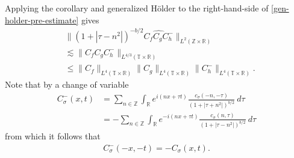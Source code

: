 \documentclass[handout]{beamer}
\numberwithin{equation}{section}
\newcommand{\rr}{\mathbb{R}}
\newcommand{\zz}{\mathbb{Z}}
\newcommand{\ci}{\mathbb{T}}
\newcommand{\wh}{\widehat}
\begin{document}
\begin{frame}

Applying the corollary and generalized H\"{o}lder to the 
right-hand-side of \eqref{gen-holder-pre-estimate} gives
%
%
\begin{equation}
	\label{gen-holder-piece-1}
	\begin{split}
		& \|\left( 1 + | \tau - n^{2 } | \right)^{-b/2} \wh{C_f C_{ 
		g } C^-_{h}}\|_{L^2(\zz \times \rr)}
		\\
		& \lesssim  \|C_f C_{g} C^-_{h} \|_{L^{4/3}(\ci \times \rr)}
		\\
		& \le \|C_f \|_{L^4(\ci \times \rr)} \|C_{g}\|_{L^4(\ci \times \rr)} 
		\|C^-_{h}\|_{L^4(\ci \times \rr)}.
	\end{split}
\end{equation}
%
%
Note that by a change of variable
%
%
\begin{equation*}
	\begin{split}
		C_\sigma^-(x, t)
		& = \sum_{n \in \zz} \int_\rr e^{i(nx +  \tau t)} \frac{c_\sigma\left( -n, -\tau \right)}{\left( 
		1 + | \tau + n^{2 } | \right)^{b/2}} \ d \tau
		\\
		& = - \sum_{n \in \zz} \int_\rr e^{-i(nx +   \tau t )}
		\frac{c_\sigma\left( n, \tau \right)}{\left( 
		1 + | \tau - n^{2 } | \right)^{b/2}} \ d \tau
	\end{split}
\end{equation*}
%
%
from which it follows that
%
%
\begin{equation*}
	\begin{split}
		C_\sigma^-(-x, -t) = -C_\sigma(x, t).
	\end{split}
\end{equation*}
%
%
%
\end{frame}
\end{document}
